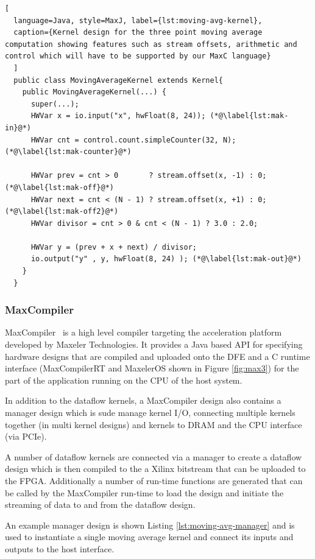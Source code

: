 \begin{lstlisting}[
  language=Java, style=MaxJ, label={lst:moving-avg-kernel},
  caption={Kernel design for the three point moving average computation showing features such as stream offsets, arithmetic and control which will have to be supported by our MaxC language}
  ]
  public class MovingAverageKernel extends Kernel{
    public MovingAverageKernel(...) {
      super(...);
      HWVar x = io.input("x", hwFloat(8, 24)); (*@\label{lst:mak-in}@*)
      HWVar cnt = control.count.simpleCounter(32, N); (*@\label{lst:mak-counter}@*)

      HWVar prev = cnt > 0       ? stream.offset(x, -1) : 0; (*@\label{lst:mak-off}@*)
      HWVar next = cnt < (N - 1) ? stream.offset(x, +1) : 0; (*@\label{lst:mak-off2}@*)
      HWVar divisor = cnt > 0 & cnt < (N - 1) ? 3.0 : 2.0;

      HWVar y = (prev + x + next) / divisor;
      io.output("y" , y, hwFloat(8, 24) ); (*@\label{lst:mak-out}@*)
    }
  }
\end{lstlisting}

\subsubsection{MaxCompiler}

\label{sec:back--maxcompiler}

MaxCompiler~\cite{5719584} is a high level compiler targeting the
acceleration platform developed by Maxeler Technologies. It provides a
Java based API for specifying hardware designs that are compiled and
uploaded onto the DFE and a C runtime interface (MaxCompilerRT and
MaxelerOS shown in Figure \ref{fig:max3}) for the part of the
application running on the CPU of the host system.

In addition to the dataflow kernels, a MaxCompiler design also
contains a manager design which is sude manage kernel I/O, connecting
multiple kernels together (in multi kernel designs) and kernels to
DRAM and the CPU interface (via PCIe).

A number of dataflow kernels are connected via a manager to create a
dataflow design which is then compiled to the a Xilinx bitstream that
can be uploaded to the FPGA. Additionally a number of run-time
functions are generated that can be called by the MaxCompiler run-time
to load the design and initiate the streaming of data to and from the
dataflow design.

An example manager design is shown Listing
\ref{lst:moving-avg-manager} and is used to instantiate a single
moving average kernel and connect its inputs and outputs to the host
interface.

